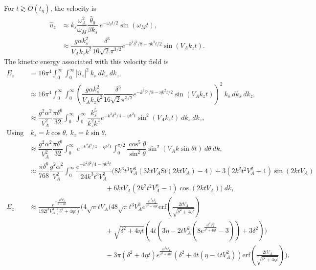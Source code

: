 \documentclass[12pt,psfig]{article}
\begin{document}
For $t\gtrsim O(t_\eta)$, the velocity is
\begin{align*}
\hat{u}_z&\approx k_s\dfrac{\omega_A^2}{\omega_M}\dfrac{\hat{\theta}_0}{\beta k_s} \ e^{-\omega_\eta t/2}\sin(\omega_Mt),\\
&\approx \dfrac{g\alpha k_s^2 }{V_A k_z k^2}\dfrac{\delta^3}{16\sqrt{2}\pi^{3/2}}e^{-k^2\delta^2/8 -\eta k^2 t/2} \sin(V_A k_z t).
\end{align*}
The kinetic energy associated with this velocity field is
\begin{align*}
E_z&=16\pi^4\int_{0}^{\infty}\int_{0}^{\infty}|\hat{u}_z|^2 \ k_s \ dk_s \ dk_z,\\
&\approx 16\pi^4\int_{0}^{\infty}\int_{0}^{\infty}\left(\dfrac{g\alpha k_s^2 }{V_A k_z k^2}\dfrac{\delta^3}{16\sqrt{2}\pi^{3/2}}e^{-k^2\delta^2/8 -\eta k^2 t/2}\sin(V_A k_z t)\right)^2 \ k_s \ dk_s \ dk_z,\\
&\approx \dfrac{g^2\alpha^2}{V_A^2}\dfrac{\pi\delta^6}{32 }\int_{0}^{\infty}\int_{0}^{\infty}\dfrac{ k_s^5 }{ k_z^2k^4}e^{-k^2\delta^2/4-\eta k^2 t} \sin^2(V_Ak_z t)  \ dk_s \ dk_z,\\
\text{Using}& \ k_s=k\cos\theta, \ k_z=k\sin\theta, \\
&\approx \dfrac{g^2\alpha^2}{V_A^2}\dfrac{\pi\delta^6}{32 }\int_{0}^{\infty}\ e^{-k^2\delta^2/4-\eta k^2 t}    \int_{0}^{\pi/2}\dfrac{\cos^5\theta}{\sin^2\theta} \sin^2(V_Ak\sin\theta t)\ d\theta \ dk,\\
&\approx \dfrac{\pi \delta^6}{768}\dfrac{g^2\alpha^2}{V_A^2}\int_{0}^{\infty}\dfrac{e^{-k^2\delta^2/4-\eta k^2 t}}{24 k^3 t^3 V_A^3}  \Biggl(8 k^3 t^3 V_A^3 (3 k t V_A \text{Si}(2 k t V_A)-4)+3 \left(2 k^2 t^2 V_A^2+1\right) \sin (2 k t V_A)\\
&\mspace{200mu} +6 k t V_A \left(2 k^2 t^2 V_A^2-1\right) \cos (2 k t V_A)\Biggr)  \ dk ,\\
E_z&\approx \frac{e^{-\frac{4 t^2 V_A^2}{\delta^2+4 \eta t}}}{192 t^3 V_A^3 \left(\delta^2+4 \eta t\right)} \Biggl(4 \sqrt{\pi } t  V_A  \biggl(48 \sqrt{\pi } t^3 V_A^3 e^{\frac{4 t^2 V_A^2}{\delta^2+4 \eta t}} \text{erf}\left(\frac{2 t  V_A }{\sqrt{\delta^2+4 \eta t}}\right)\\
&\mspace{200mu}+\sqrt{\delta^2+4 \eta t} \left(4 t \left(3 \eta-2 t V_A^2 \left(8 e^{\frac{4 t^2 V_A^2}{\delta^2+4 \eta t}}-3\right)\right)+3 \delta^2\right)\biggr)\\
&\mspace{200mu}-3 \pi  \left(\delta^2+4 \eta t\right) e^{\frac{4 t^2 V_A^2}{\delta^2+4 \eta t}} \left(\delta^2+4 t \left(\eta-4 t V_A^2\right)\right) \text{erf}\left(\frac{2 t  V_A }{\sqrt{\delta^2+4 \eta t}}\right)\Biggr).
\end{align*}
\end{document}

